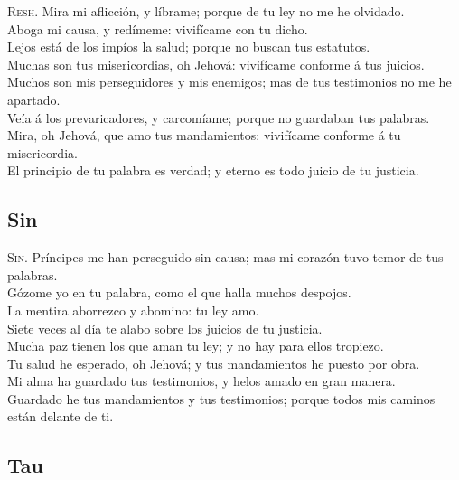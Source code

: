  \textsc{Resh}. Mira mi aflicción, y líbrame; porque de
tu ley no me he olvidado.\\
 Aboga mi causa, y redímeme: vivifícame con tu dicho.\\
 Lejos está de los impíos la salud; porque no buscan tus
estatutos.\\
 Muchas son tus misericordias, oh Jehová: vivifícame
conforme á tus juicios.\\
 Muchos son mis perseguidores y mis enemigos; mas de tus
testimonios no me he apartado.\\
 Veía á los prevaricadores, y carcomíame; porque no
guardaban tus palabras.\\
 Mira, oh Jehová, que amo tus mandamientos: vivifícame
conforme á tu misericordia.\\
 El principio de tu palabra es verdad; y eterno es todo
juicio de tu justicia.

\hypertarget{sin}{%
\subsection{Sin}\label{sin}}

 \textsc{Sin}. Príncipes me han perseguido sin causa;
mas mi corazón tuvo temor de tus palabras.\\
 Gózome yo en tu palabra, como el que halla muchos
despojos.\\
 La mentira aborrezco y abomino: tu ley amo.\\
 Siete veces al día te alabo sobre los juicios de tu
justicia.\\
 Mucha paz tienen los que aman tu ley; y no hay para
ellos tropiezo.\\
 Tu salud he esperado, oh Jehová; y tus mandamientos he
puesto por obra.\\
 Mi alma ha guardado tus testimonios, y helos amado en
gran manera.\\
 Guardado he tus mandamientos y tus testimonios; porque
todos mis caminos están delante de ti.

\hypertarget{tau}{%
\subsection{Tau}\label{tau}}

